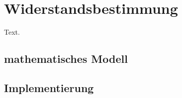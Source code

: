\chapter{Widerstandsbestimmung}\label{s:widerstandsbestimmung}


Text.
\section{mathematisches Modell}

\section{Implementierung}

